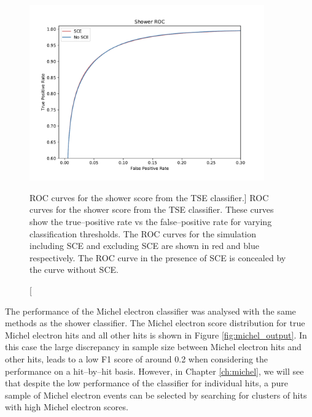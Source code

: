 \begin{figure}
	\centering
	\includegraphics[width=0.9\textwidth]{figures/show_roc_comparison.pdf}
	\caption
	[ROC curves for the shower score from the TSE classifier.]
	{ROC curves for the shower score from the TSE classifier. These curves show
	the true--positive rate vs the false--positive rate for varying classification
	thresholds. The ROC curves for the \protodune{} simulation including SCE and
	excluding SCE are shown in red and blue respectively. The ROC curve in the
	presence of SCE is concealed by the curve without SCE.}
	\label{fig:show_roc}
\end{figure}

The performance of the Michel electron classifier was analysed with the same
methods as the shower classifier. The Michel electron score distribution for
true Michel electron hits and all other hits is shown in Figure
\ref{fig:michel_output}. In this case the large discrepancy in sample size
between Michel electron hits and other hits, leads to a low F1 score of around
0.2 when considering the performance on a hit--by--hit basis. However, in
Chapter \ref{ch:michel}, we will see that despite the low performance of the
classifier for individual hits, a pure sample of Michel electron events can be
selected by searching for clusters of hits with high Michel electron scores.

